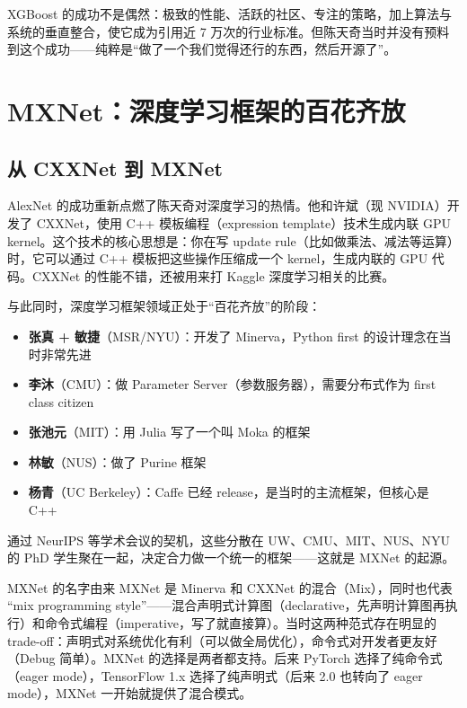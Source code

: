 \documentclass[a4paper]{article}
\begin{document}
XGBoost 的成功不是偶然：极致的性能、活跃的社区、专注的策略，加上算法与系统的垂直整合，使它成为引用近 7 万次的行业标准。但陈天奇当时并没有预料到这个成功------纯粹是``做了一个我们觉得还行的东西，然后开源了''。

\section{MXNet：深度学习框架的百花齐放}

\subsection{从 CXXNet 到 MXNet}

AlexNet 的成功重新点燃了陈天奇对深度学习的热情。他和许斌（现 NVIDIA）开发了 CXXNet，使用 C++ 模板编程（expression template）技术生成内联 GPU kernel。这个技术的核心思想是：你在写 update rule（比如做乘法、减法等运算）时，它可以通过 C++ 模板把这些操作压缩成一个 kernel，生成内联的 GPU 代码。CXXNet 的性能不错，还被用来打 Kaggle 深度学习相关的比赛。

与此同时，深度学习框架领域正处于``百花齐放''的阶段：

\begin{itemize}
    \item \textbf{张真 + 敏捷}（MSR/NYU）：开发了 Minerva，Python first 的设计理念在当时非常先进
    \item \textbf{李沐}（CMU）：做 Parameter Server（参数服务器），需要分布式作为 first class citizen
    \item \textbf{张池元}（MIT）：用 Julia 写了一个叫 Moka 的框架
    \item \textbf{林敏}（NUS）：做了 Purine 框架
    \item \textbf{杨青}（UC Berkeley）：Caffe 已经 release，是当时的主流框架，但核心是 C++
\end{itemize}

通过 NeurIPS 等学术会议的契机，这些分散在 UW、CMU、MIT、NUS、NYU 的 PhD 学生聚在一起，决定合力做一个统一的框架------这就是 MXNet 的起源。

\begin{knowledgebox}{MXNet 的名字由来}
MXNet 是 Minerva 和 CXXNet 的混合（Mix），同时也代表 ``mix programming style''------混合声明式计算图（declarative，先声明计算图再执行）和命令式编程（imperative，写了就直接算）。当时这两种范式存在明显的 trade-off：声明式对系统优化有利（可以做全局优化），命令式对开发者更友好（Debug 简单）。MXNet 的选择是两者都支持。后来 PyTorch 选择了纯命令式（eager mode），TensorFlow 1.x 选择了纯声明式（后来 2.0 也转向了 eager mode），MXNet 一开始就提供了混合模式。
\end{knowledgebox}
\end{document}
